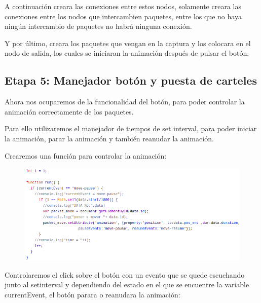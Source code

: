 \documentclass[a4paper, 12pt]{book}
\begin{document}
A continuación creara las conexiones entre estos nodos, solamente creara las conexiones entre los nodos que intercambien paquetes, entre los que no haya ningún intercambio de paquetes no habrá ninguna conexión.

Y por último, creara los paquetes que vengan en la captura y los colocara en el nodo de salida, los cuales se iniciaran la animación después de pulsar el botón.

\subsection{Etapa 5: Manejador botón y puesta de carteles}
Ahora nos ocuparemos de la funcionalidad del botón, para poder controlar la animación correctamente de los paquetes.

Para ello utilizaremos el manejador de tiempos de set interval, para poder iniciar la animación, parar la animación y también reanudar la animación.

Crearemos una función para controlar la animación:
\begin{figure}[h]
\centering
    \includegraphics[scale=0.52]{img/func_run.png}
\end{figure}


Controlaremos el click sobre el botón con un evento que se quede escuchando junto al setinterval y dependiendo del estado en el que se encuentre la variable currentEvent, el botón parara o reanudara la animación:
\end{document}
